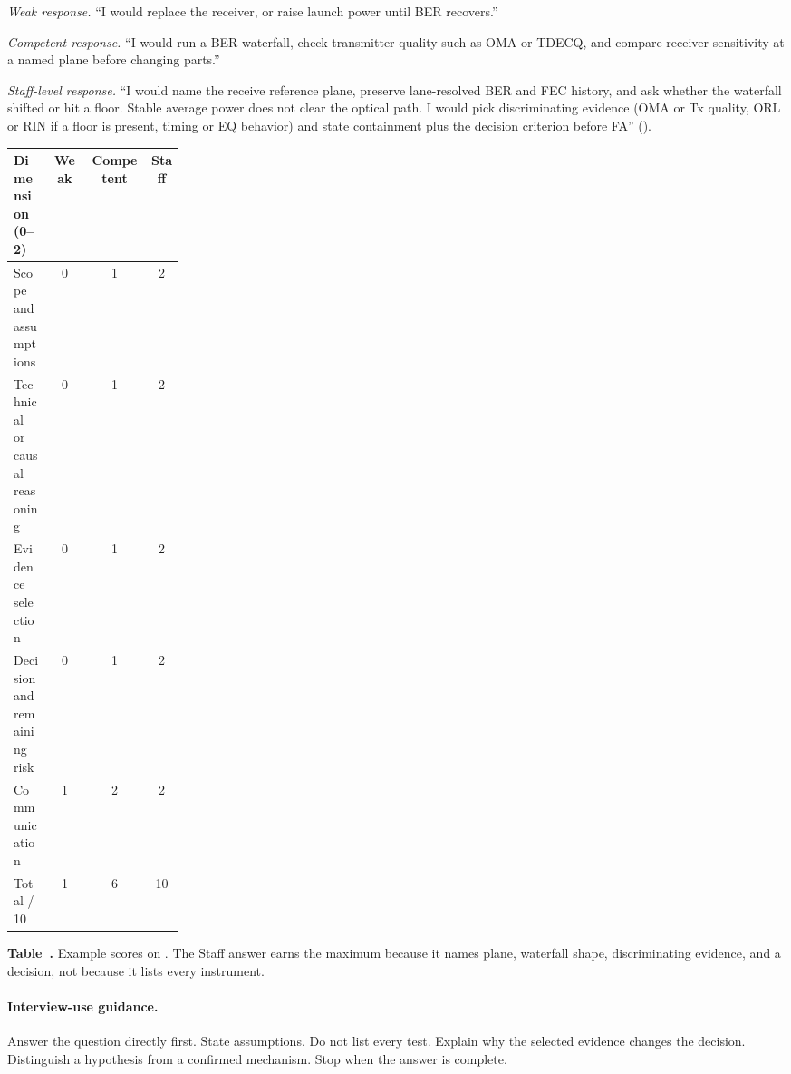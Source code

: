 \textit{Weak response.}
``I would replace the receiver, or raise launch power until BER recovers.''

\textit{Competent response.}
``I would run a BER waterfall, check transmitter quality such as OMA or TDECQ,
and compare receiver sensitivity at a named plane before changing parts.''

\textit{Staff-level response.}
``I would name the receive reference plane, preserve lane-resolved BER and FEC
history, and ask whether the waterfall shifted or hit a floor. Stable average
power does not clear the optical path. I would pick discriminating evidence
(OMA or Tx quality, ORL or RIN if a floor is present, timing or EQ behavior)
and state containment plus the decision criterion before FA''
().

\begin{table}[ht]
\label{tab:chapter-rubric-example}%
\centering
\setlength{\tabcolsep}{3pt}%
\footnotesize
\renewcommand{\arraystretch}{1.2}%
\begin{tabular}{@{}p{0.22\linewidth}ccc@{}}
\toprule
Dimension (0--2) & Weak & Competent & Staff \\
\midrule
Scope and assumptions & 0 & 1 & 2 \\
Technical or causal reasoning & 0 & 1 & 2 \\
Evidence selection & 0 & 1 & 2 \\
Decision and remaining risk & 0 & 1 & 2 \\
Communication & 1 & 2 & 2 \\
\midrule
Total / 10 & 1 & 6 & 10 \\
\bottomrule
\end{tabular}
\par\medskip
{\raggedright\footnotesize\textbf{Table~\thetable.} Example scores on
. The Staff answer earns the maximum because
it names plane, waterfall shape, discriminating evidence, and a decision, not
because it lists every instrument.\par}
\end{table}

\paragraph{Interview-use guidance.}
Answer the question directly first. State assumptions. Do not list every test.
Explain why the selected evidence changes the decision. Distinguish a hypothesis
from a confirmed mechanism. Stop when the answer is complete.

